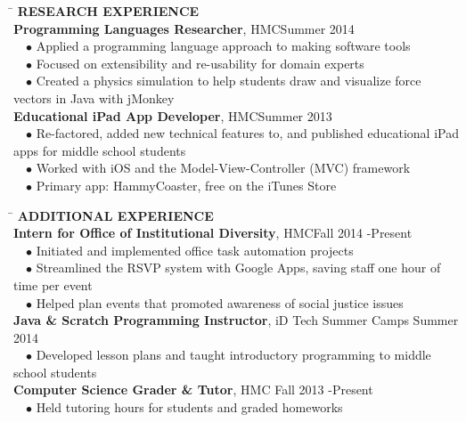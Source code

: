 \documentclass[11pt]{article}
\newcommand{\sectionNL}{\\[-2pt]}
\newcommand{\customtab}{$\hspace{10pt} \bullet \hspace{2pt}$}
\newcommand{\customtabinline}{$\hspace{23pt}$}
\newcommand{\HMC}{HMC}
\begin{document}
\begin{tabbing} 
\hspace*{6.5in}\= \kill
{\textbf{RESEARCH EXPERIENCE} } \> \sectionNL
\textbf{Programming Languages Researcher}, \HMC \>Summer 2014 \\
\customtab Applied a programming language approach to making software tools \\
\customtab Focused on extensibility and re-usability for domain experts \\ 
\customtab Created a physics simulation to help students draw and visualize force vectors in Java with jMonkey\\

\textbf{Educational iPad App Developer}, \HMC \>Summer 2013 \\
\customtab Re-factored, added new technical features to, and published educational iPad apps for middle school students \\
\customtab Worked with iOS and the Model-View-Controller (MVC) framework \\
\customtab Primary app: HammyCoaster, free on the iTunes Store
\end{tabbing}


\begin{tabbing} 
\hspace*{6.5in}\= \kill
{\textbf{ADDITIONAL EXPERIENCE } } \> \sectionNL
\textbf{Intern for Office of Institutional Diversity}, \HMC \>Fall 2014 -Present \\
\customtab Initiated and implemented office task automation projects\\
\customtab Streamlined the RSVP system with Google Apps, saving staff one hour of time per event  \\
\customtab Helped plan events that promoted awareness of social justice issues \\

\textbf{Java \& Scratch Programming Instructor}, iD Tech Summer Camps \> Summer 2014 \\
\customtab Developed lesson plans and taught introductory programming to  middle school students\\

\textbf{Computer Science Grader \& Tutor}, \HMC \> Fall 2013 -Present \\ %
\customtab Held tutoring hours for students and graded homeworks
\end{tabbing}
\end{document}
